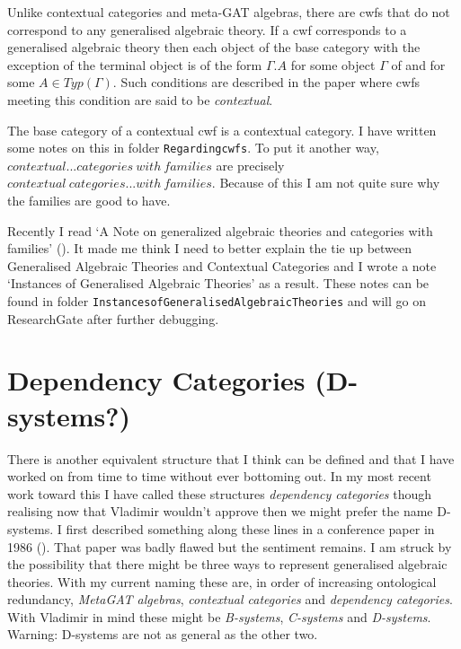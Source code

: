 \documentclass[10pt,a4paper]{article}
\theoremstyle{remark}
\begin{document}
\note
Unlike contextual categories and meta-GAT algebras, there are cwfs that do not correspond to
any generalised algebraic theory. If a cwf corresponds to a generalised algebraic theory then each object of the base category \catcw with the exception of the terminal object is of the form $\Gamma.A$ for some object $\Gamma$ of \catcw and for some $A \in Typ(\Gamma)$. Such conditions are described in the paper \cite{??}
where cwfs meeting this condition are said to be \textit{contextual}.

\note The base category of a  contextual cwf is a contextual category. I have written some notes on this in folder \verb!Regardingcwfs!. 
To put it another way, $contextual ... categories\  with\  families$ are precisely $contextual\ categories...with\ families$. Because of this
I am not quite sure why the families are good to have. 

\note Recently I read  `A Note on generalized algebraic theories and categories with families' (\cite{BCDEpaper}). It made me think I need to better explain the tie up between 
Generalised Algebraic Theories and Contextual Categories and I wrote a note `Instances of Generalised Algebraic Theories' as a result.
These notes can be found in folder \verb!InstancesofGeneralisedAlgebraicTheories! and will go on ResearchGate after further debugging.


\section{Dependency Categories (D-systems?)}

\note 
There is another equivalent structure that I think can be defined and that I have worked on from time to time without ever bottoming out. In my most recent work toward this I have called these
structures \textit{dependency categories} though realising now that Vladimir wouldn't approve then we might prefer the name D-systems. 
I first described something along these lines in a conference paper in 1986 (\cite{Cartmell86B}). That paper was badly flawed  but the sentiment remains. 
\note
I am struck by the possibility that there might be three ways to represent generalised algebraic theories.
With my current naming these are, in order of increasing ontological redundancy, \textit{MetaGAT algebras}, \textit{contextual categories} and
\textit{dependency categories}. With Vladimir in mind these might be \textit{B-systems}, \textit{C-systems} and \textit{D-systems}. Warning:  D-systems are not  as general as the other two.
\end{document}
